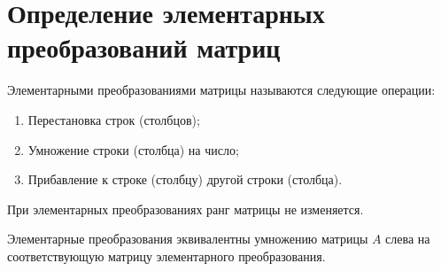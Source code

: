 \section{Определение элементарных преобразований матриц}

\begin{definition}
Элементарными преобразованиями матрицы называются следующие операции:
\begin{enumerate}
    \item Перестановка строк (столбцов);
    \item Умножение строки (столбца) на число;
    \item Прибавление к строке (столбцу) другой строки (столбца).
\end{enumerate}
\end{definition}

\begin{theorem}
При элементарных преобразованиях ранг матрицы не изменяется.
\end{theorem}

\begin{theorem}
Элементарные преобразования эквивалентны умножению матрицы $A$ слева на соответствующую матрицу элементарного преобразования.
\end{theorem}
